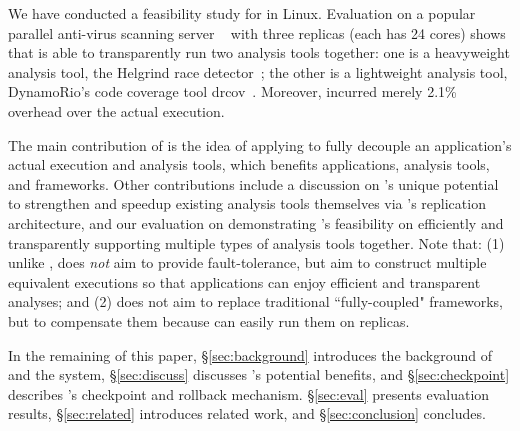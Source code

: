We have conducted a feasibility study for \xxx in Linux. Evaluation on a 
popular parallel anti-virus scanning server \clamav~\cite{clamav} with three 
replicas (each has 24 cores) shows that \xxx is able to transparently run two 
analysis tools together: one is a heavyweight analysis tool, the Helgrind race 
detector~\cite{valgrind:pldi}; the other is a lightweight analysis tool, 
DynamoRio's code coverage tool drcov~\cite{dynamorio}. Moreover, \xxx incurred 
merely 2.1\% overhead over the actual execution.


The main contribution of \xxx is the idea of applying \tsmr to fully decouple 
an application's actual execution and analysis tools, which benefits 
applications, analysis tools, and frameworks. Other contributions include a 
discussion on \xxx's unique potential to strengthen and speedup existing 
analysis tools themselves via \xxx's replication architecture, and our 
evaluation on demonstrating \xxx's feasibility on efficiently and transparently 
supporting multiple types of analysis tools together. Note that: (1) unlike 
\repbox, \xxx does \emph{not} aim to provide fault-tolerance, but aim to 
construct multiple equivalent executions so that applications can enjoy 
efficient and transparent analyses; and (2) \xxx does not aim to replace 
traditional ``fully-coupled" frameworks, but to compensate them because \xxx 
can easily run them on replicas.


In the remaining of this paper, \S\ref{sec:background} introduces the 
background of \tsmr and the \repbox system, \S\ref{sec:discuss} discusses 
\xxx's potential benefits, and \S\ref{sec:checkpoint} describes \xxx's 
checkpoint and rollback mechanism. \S\ref{sec:eval} presents evaluation 
results, \S\ref{sec:related} introduces related work, and 
\S\ref{sec:conclusion} concludes.